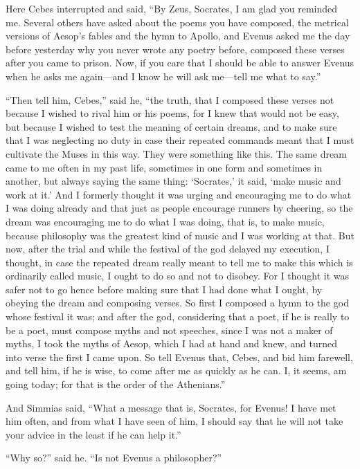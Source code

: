 \documentclass[letterpaper,12pt]{article}
\newcommand{\stephpag}[1]{\marginnote{\small\itshape\fontfamily{ppl}\selectfont #1}}
\begin{document}
\begin{drama}
Here Cebes interrupted and said, ``By Zeus, Socrates, I am glad you reminded me. \stephpag{d} Several others have asked about the poems you have composed, the metrical versions of Aesop's fables and the hymn to Apollo, and Evenus asked me the day before yesterday why you never wrote any poetry before, composed these verses after you came to prison. Now, if you care that I should be able to answer Evenus when he asks me again---and I know he will ask me---tell me what to say.''
 
``Then tell him, Cebes,'' said he, ``the truth, that I composed these verses not because I wished to rival him or his poems, \stephpag{e} for I knew that would not be easy, but because I wished to test the meaning of certain dreams, and to make sure that I was neglecting no duty in case their repeated commands meant that I must cultivate the Muses in this way. They were something like this. The same dream came to me often in my past life, sometimes in one form and sometimes in another, but always saying the same thing: `Socrates,' it said, `make music and work at it.' And I formerly thought it was urging and encouraging me \stephpag{61 a} to do what I was doing already and that just as people encourage runners by cheering, so the dream was encouraging me to do what I was doing, that is, to make music, because philosophy was the greatest kind of music and I was working at that. But now, after the trial and while the festival of the god delayed my execution, I thought, in case the repeated dream really meant to tell me to make this which is ordinarily called music, I ought to do so and not to disobey. For I thought it was safer not to go hence \stephpag{b} before making sure that I had done what I ought, by obeying the dream and composing verses. So first I composed a hymn to the god whose festival it was; and after the god, considering that a poet, if he is really to be a poet, must compose myths and not speeches, since I was not a maker of myths, I took the myths of Aesop, which I had at hand and knew, and turned into verse the first I came upon. So tell Evenus that, Cebes, and bid him farewell, and tell him, if he is wise, to come after me as quickly as he can. \stephpag{c} I, it seems, am going today; for that is the order of the Athenians.''
 
And Simmias said, ``What a message that is, Socrates, for Evenus! I have met him often, and from what I have seen of him, I should say that he will not take your advice in the least if he can help it.''
 
``Why so?'' said he. ``Is not Evenus a philosopher?''
 

\end{drama}
\end{document}
